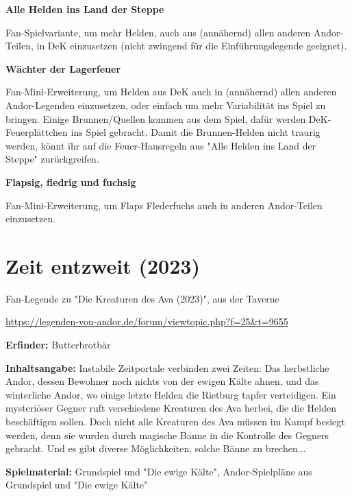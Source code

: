{

\textbf{Alle Helden ins Land der Steppe}

Fan-Spielvariante, um mehr Helden, auch aus (annähernd) allen anderen Andor-Teilen, in DeK einzusetzen (nicht zwingend für die Einführungslegende geeignet).\bigskip

\textbf{Wächter der Lagerfeuer}

Fan-Mini-Erweiterung, um Helden aus DeK auch in (annähernd) allen anderen Andor-Legenden einzusetzen, oder einfach um mehr Variabilität ins Spiel zu bringen.
Einige Brunnen/Quellen kommen aus dem Spiel, dafür werden DeK-Feuerplättchen ins Spiel gebracht. Damit die Brunnen-Helden nicht traurig werden, könnt ihr auf die Feuer-Hausregeln aus "Alle Helden ins Land der Steppe" zurückgreifen.\bigskip

\textbf{Flapsig, fledrig und fuchsig}

Fan-Mini-Erweiterung, um Flaps Flederfuchs auch in anderen Andor-Teilen einzusetzen.




\newpage
\section{Zeit entzweit (2023)}

\begin{center}
    Fan-Legende zu "Die Kreaturen des Ava (2023)", aus der Taverne

    \url{https://legenden-von-andor.de/forum/viewtopic.php?f=25&t=9655}
\end{center}


\textbf{Erfinder:} Butterbrotbär

\textbf{Inhaltsangabe:} Instabile Zeitportale verbinden zwei Zeiten: Das herbstliche Andor, dessen Bewohner noch nichts von der ewigen Kälte ahnen, und das winterliche Andor, wo einige letzte Helden die Rietburg tapfer verteidigen. Ein mysteriöser Gegner ruft verschiedene Kreaturen des Ava herbei, die die Helden beschäftigen sollen. Doch nicht alle Kreaturen des Ava müssen im Kampf besiegt werden, denn sie wurden durch magische Banne in die Kontrolle des Gegners gebracht. Und es gibt diverse Möglichkeiten, solche Bänne zu brechen...

\textbf{Spielmaterial:} Grundspiel und "Die ewige Kälte", Andor-Spielpläne aus Grundspiel und "Die ewige Kälte"

}
